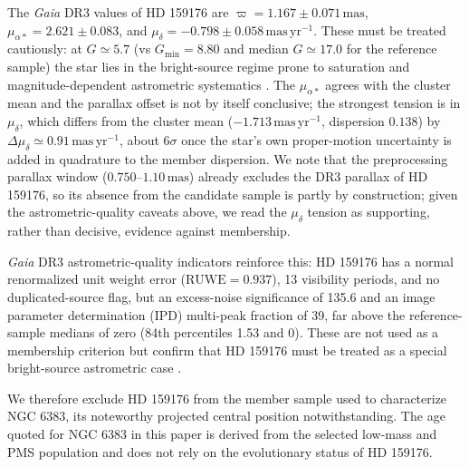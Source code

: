 \documentclass{aa}
\begin{document}
The \textit{Gaia} DR3 values of HD 159176 are $\varpi = 1.167 \pm 0.071\,\mathrm{mas}$, $\mu_{\alpha*}=2.621 \pm 0.083$, and $\mu_{\delta}=-0.798 \pm 0.058\,\mathrm{mas\,yr^{-1}}$. These must be treated cautiously: at $G\simeq5.7$ (vs $G_{\min}=8.80$ and median $G\simeq17.0$ for the reference sample) the star lies in the bright-source regime prone to saturation and magnitude-dependent astrometric systematics \citep{2021A&A...649A...2L,2021A&A...649A...4L,2021A&A...649A.124C,2022A&A...657A.130M}. The $\mu_{\alpha*}$ agrees with the cluster mean and the parallax offset is not by itself conclusive; the strongest tension is in $\mu_{\delta}$, which differs from the cluster mean ($-1.713\,\mathrm{mas\,yr^{-1}}$, dispersion $0.138$) by $\Delta\mu_{\delta}\simeq0.91\,\mathrm{mas\,yr^{-1}}$, about $6\sigma$ once the star's own proper-motion uncertainty is added in quadrature to the member dispersion. We note that the preprocessing parallax window ($0.750$--$1.10\,\mathrm{mas}$) already excludes the DR3 parallax of HD 159176, so its absence from the candidate sample is partly by construction; given the astrometric-quality caveats above, we read the $\mu_{\delta}$ tension as supporting, rather than decisive, evidence against membership.

\textit{Gaia} DR3 astrometric-quality indicators reinforce this: HD 159176 has a normal renormalized unit weight error ($\mathrm{RUWE}=0.937$), 13 visibility periods, and no duplicated-source flag, but an excess-noise significance of 135.6 and an image parameter determination (IPD) multi-peak fraction of 39, far above the reference-sample medians of zero (84th percentiles 1.53 and 0). These are not used as a membership criterion but confirm that HD 159176 must be treated as a special bright-source astrometric case \citep{2022MNRAS.510.2597R}.

We therefore exclude HD 159176 from the member sample used to characterize NGC 6383, its noteworthy projected central position notwithstanding. The age quoted for NGC 6383 in this paper is derived from the selected low-mass and PMS population and does not rely on the evolutionary status of HD 159176.
\end{document}
